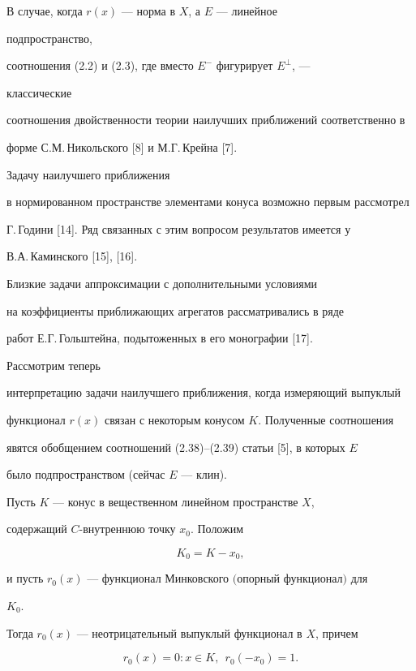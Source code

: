  


В случае, когда $r(x)$ --- норма в $X$, а $E$ --- линейное 


подпространство, 


соотношения (2.2) и (2.3), где вместо $E^-$ фигурирует $E^\bot$, --- 


классические 


соотношения двойственности теории наилучших приближений соответственно в 


форме С.М.\,Никольского [8] и М.Г.\,Крейна [7]. 


Задачу наилучшего приближения 


в нормированном пространстве элементами конуса возможно первым рассмотрел 


Г.\,Години [14]. Ряд связанных с этим вопросом результатов имеется у 


В.А.\,Каминского [15], [16]. 


Близкие задачи аппроксимации с дополнительными условиями 


на коэффициенты приближающих агрегатов рассматривались в ряде 


работ Е.Г.\,Гольштейна, подытоженных в его монографии [17]. 


 


Рассмотрим теперь 


интерпретацию задачи наилучшего приближения, когда измеряющий выпуклый 


функционал $r(x)$ связан с некоторым конусом $K$. Полученные соотношения 


явятся обобщением соотношений (2.38)--(2.39) статьи [5], в которых $E$ 


было подпространством (сейчас $E$ --- клин). 


 


\begin{lems} 


Пусть $K$ --- конус в вещественном линейном пространстве $X$, 


содержащий $C$-внутреннюю точку $x_0$. Положим 


\begin{equation} 


K_0=K-x_0, 


\end{equation} 


и пусть $r_0(x)$ --- функционал Минковского $($опорный функционал\/$)$ для 


$K_0$. 


Тогда $r_0(x)$ --- неотрицательный выпуклый функционал в $X$, причем 


\begin{equation} 


r_0(x)=0:x\in K,\ \ r_0(-x_0)=1. 


\end{equation} 


\end{lems} 


